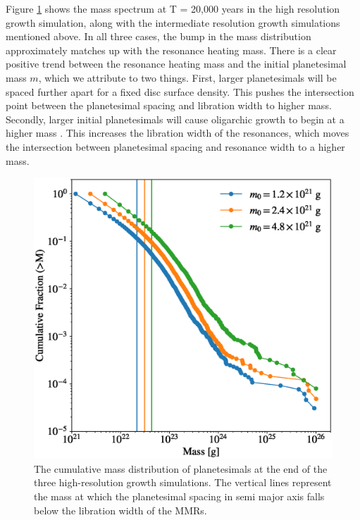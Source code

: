 Figure \ref{fig:resolution_mass_dist} shows the mass spectrum at T = 20,000 years in the high resolution growth simulation, 
along with the intermediate resolution growth simulations mentioned above. In all three cases, the bump in the mass distribution 
approximately matches up with the resonance heating mass. There is a clear positive trend between the resonance heating 
mass and the initial planetesimal mass $m$, which we attribute to two things. First, larger planetesimals will be spaced further 
apart for a fixed disc surface density. This pushes the intersection point between the planetesimal spacing and libration width to 
higher mass. Secondly, larger initial planetesimals will cause oligarchic growth to begin at a higher mass \cite{morishima17}. 
This increases the libration width of the resonances, which moves the intersection between planetesimal spacing and resonance 
width to a higher mass.

\begin{figure}
    \includegraphics[width=\columnwidth]{figures/plSS/cum_model_comparison.eps}
    \caption{The cumulative mass distribution of planetesimals at the end of the three high-resolution growth simulations. The 
    vertical lines represent the mass at which the planetesimal spacing in semi major axis falls below the libration width of the 
    MMRs.}
    \label{fig:resolution_mass_dist}
\end{figure}

